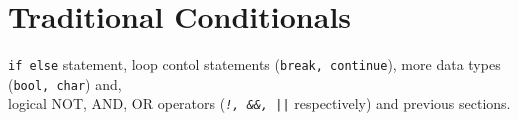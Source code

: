 \documentclass[../../Problems]{subfiles}
\begin{document}
\section{Traditional Conditionals}
\begin{topics}
\verb!if else! statement, loop contol statements (\verb!break, continue!), more data types (\verb!bool, char!) and, \\logical NOT, AND, OR operators (\emph{\texttt{!, \&\&, ||}} respectively) and previous sections.
\end{topics}




\end{document}
